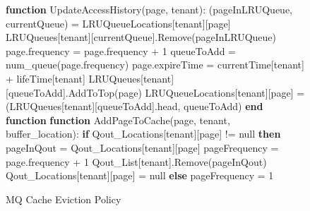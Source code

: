 \begin{figure}[htbp]
    \centering
    \begin{minipage}{\linewidth}
    \begin{algorithm}[H]
        \caption{MQ Cache Eviction Policy}
        \begin{algorithmic}
            \STATE \textbf{function} UpdateAccessHistory(page, tenant):
            \STATE \hspace{\algorithmicindent} (pageInLRUQueue, currentQueue) = LRUQueueLocations[tenant][page]
            \STATE \hspace{\algorithmicindent} LRUQueues[tenant][currentQueue].Remove(pageInLRUQueue)
            \STATE \hspace{\algorithmicindent} page.frequency = page.frequency + 1
            \STATE \hspace{\algorithmicindent} queueToAdd = num\_queue(page.frequency)
            \STATE \hspace{\algorithmicindent} page.expireTime = currentTime[tenant] + lifeTime[tenant]
            \STATE \hspace{\algorithmicindent} LRUQueues[tenant][queueToAdd].AddToTop(page)
            \STATE \hspace{\algorithmicindent} LRUQueueLocations[tenant][page] = (LRUQueues[tenant][queueToAdd].head, queueToAdd)
            \STATE \textbf{end function}
            \STATE
            \STATE \textbf{function} AddPageToCache(page, tenant, buffer\_location):
            \STATE \hspace{\algorithmicindent} \textbf{if} Qout\_Locations[tenant][page] != null \textbf{then}
            \STATE \hspace{\algorithmicindent} \hspace{\algorithmicindent} pageInQout = Qout\_Locations[tenant][page]
            \STATE \hspace{\algorithmicindent} \hspace{\algorithmicindent} pageFrequency = page.frequency + 1
            \STATE \hspace{\algorithmicindent} \hspace{\algorithmicindent} Qout\_List[tenant].Remove(pageInQout)
            \STATE \hspace{\algorithmicindent} \hspace{\algorithmicindent} Qout\_Locations[tenant][page] = null
            \STATE \hspace{\algorithmicindent} \textbf{else}
            \STATE \hspace{\algorithmicindent} \hspace{\algorithmicindent} pageFrequency = 1

\end{algorithmic}
\end{algorithm}
\end{minipage}
\end{figure}
